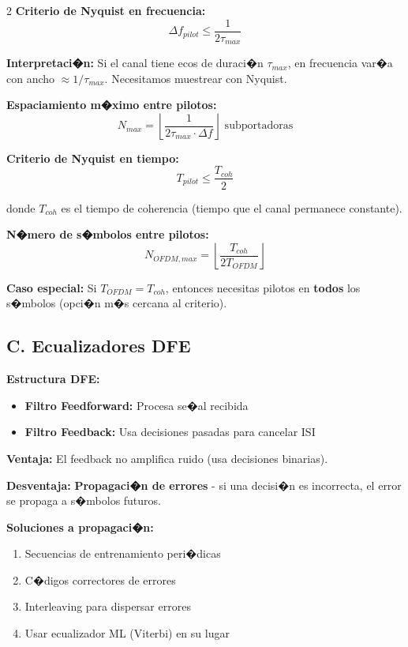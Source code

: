 ﻿\documentclass[8pt,a4paper]{article}
\begin{document}
\begin{multicols}{2}
\textbf{Criterio de Nyquist en frecuencia:}
\[
\boxed{\Delta f_{pilot} \leq \frac{1}{2\tau_{max}}}
\]

\textbf{Interpretaci�n:} Si el canal tiene ecos de duraci�n $\tau_{max}$, en frecuencia var�a con ancho $\approx 1/\tau_{max}$. Necesitamos muestrear con Nyquist.

\textbf{Espaciamiento m�ximo entre pilotos:}
\[
N_{max} = \left\lfloor \frac{1}{2\tau_{max} \cdot \Delta f} \right\rfloor \text{ subportadoras}
\]

\textbf{Criterio de Nyquist en tiempo:}
\[
\boxed{T_{pilot} \leq \frac{T_{coh}}{2}}
\]

donde $T_{coh}$ es el tiempo de coherencia (tiempo que el canal permanece constante).

\textbf{N�mero de s�mbolos entre pilotos:}
\[
N_{OFDM,max} = \left\lfloor \frac{T_{coh}}{2T_{OFDM}} \right\rfloor
\]

\textbf{Caso especial:} Si $T_{OFDM} = T_{coh}$, entonces necesitas pilotos en \textbf{todos} los s�mbolos (opci�n m�s cercana al criterio).

\vspace{-2mm}
\subsection*{\small C. Ecualizadores DFE}
\vspace{-2mm}

\textbf{Estructura DFE:}

\begin{itemize}[leftmargin=*,itemsep=2pt]
    \item \textbf{Filtro Feedforward:} Procesa se�al recibida
    \item \textbf{Filtro Feedback:} Usa decisiones pasadas para cancelar ISI
\end{itemize}

\textbf{Ventaja:} El feedback no amplifica ruido (usa decisiones binarias).

\textbf{Desventaja:} \textbf{Propagaci�n de errores} - si una decisi�n es incorrecta, el error se propaga a s�mbolos futuros.

\textbf{Soluciones a propagaci�n:}
\begin{enumerate}[leftmargin=*,itemsep=1pt]
    \item Secuencias de entrenamiento peri�dicas
    \item C�digos correctores de errores
    \item Interleaving para dispersar errores
    \item Usar ecualizador ML (Viterbi) en su lugar
\end{enumerate}


\end{multicols}
\end{document}
